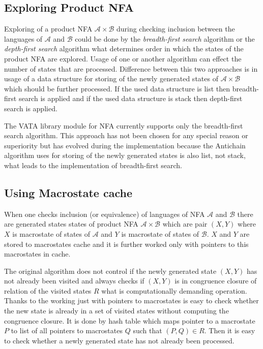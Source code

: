 \subsection{Exploring Product NFA}
Exploring of a product NFA $\mathcal{A}\times\mathcal{B}$ during checking inclusion between the languages of $\mathcal{A}$ and $\mathcal{B}$ could be done by 
the \emph{breadth-first search} \cite{taocp} algorithm or the \emph{depth-first search} \cite{taocp} algorithm what
determines order in which the states of the product NFA are explored. Usage of one or another algorithm can effect the number of states that are processed. 
Difference between this two approaches is in usage of a data structure for storing of the newly generated states of $\mathcal{A}\times\mathcal{B}$
which should be further processed. If the used data structure is list then breadth-first search is applied and if the used data structure is stack then 
depth-first search is applied.

The VATA library module for NFA currently supports only the breadth-first search algorithm. This approach has not been chosen for any special reason or superiority
but has evolved during the implementation because the Antichain algorithm uses for storing of 
the newly generated states is also list, not stack, what leads to the implementation of breadth-first search.


\subsection{Using Macrostate cache}
When one checks inclusion (or equivalence) of languages of NFA $\mathcal{A}$ and $\mathcal{B}$ there are generated states states of product NFA $\mathcal{A}
\times \mathcal{B}$ which are pair $(X,Y)$ where $X$ is macrostate of states of $\mathcal{A}$ and $Y$ is macrostate of states of $\mathcal{B}$. $X$ and $Y$
are stored to macrostates cache and it is further worked only with pointers to this macrostates in cache.

The original algorithm does not control if the newly generated state $(X,Y)$ has not already been visited and always checks if $(X,Y)$ is in
congruence closure of relation of the visited states $R$  what is
computationally demanding operation. Thanks to the working just with pointers to macrostates is easy to check whether the new state is already in a set of 
visited states without computing the congruence closure. It is done by hash table which maps pointer to a macrostate $P$ to list of all
pointers to macrostates $Q$ such that $(P,Q)\in R$. Then it is easy to check whether a newly generated state has not already been processed. 

